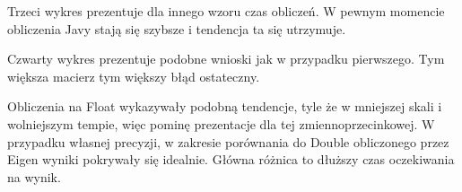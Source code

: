 \documentclass[10pt]{article}
\begin{document}
Trzeci wykres prezentuje dla innego wzoru czas obliczeń. W pewnym momencie obliczenia Javy stają się szybsze
i tendencja ta się utrzymuje.
\begin{center}
\end{center}

Czwarty wykres prezentuje podobne wnioski jak w przypadku pierwszego. Tym większa macierz tym większy błąd ostateczny. 
\begin{center}
\end{center}

Obliczenia na Float wykazywały podobną tendencje, tyle że w mniejszej skali i wolniejszym tempie, więc pominę prezentacje dla tej zmiennoprzecinkowej.
W przypadku własnej precyzji, w zakresie porównania do Double obliczonego przez Eigen wyniki pokrywały się idealnie. Główna różnica to dłuższy czas oczekiwania na wynik.
\end{document}
